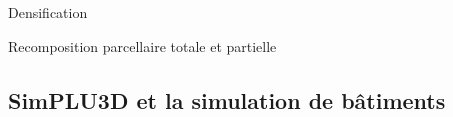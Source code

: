 \documentclass[xcolor=table]{beamer}
\begin{document}
\begin{frame}{Densification}
\end{frame}


\begin{frame}{Recomposition parcellaire totale et partielle}
\end{frame}


\subsection[SimPLU3D]{SimPLU3D et la simulation de bâtiments}
\begin{frame}
\subsectionpage
\end{frame}
\end{document}
